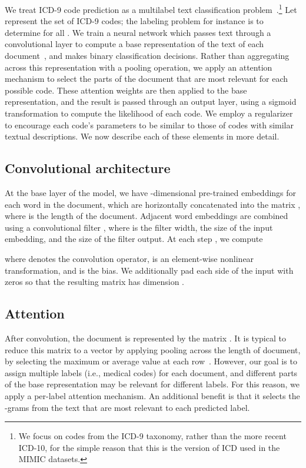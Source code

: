 \documentclass[11pt,a4paper]{article}
\begin{document}
We treat ICD-9 code prediction as a multilabel text classification problem~\cite{mccallum1999multi}.\footnote{We focus on codes from the ICD-9 taxonomy, rather than the more recent ICD-10, for the simple reason that this is the version of ICD used in the MIMIC datasets.} Let  represent the set of ICD-9 codes; the labeling problem for instance  is to determine  for all . We train a neural network which passes text through a convolutional layer to compute a base representation of the text of each document~\cite{kim2014convolutional}, and makes  binary classification decisions. Rather than aggregating across this representation with a pooling operation, we apply an attention mechanism to select the parts of the document that are most relevant for each possible code. These attention weights are then applied to the base representation, and the result is passed through an output layer, using a sigmoid transformation to compute the likelihood of each code. 
We employ a regularizer to encourage each code's parameters to be similar to those of codes with similar textual descriptions. We now describe each of these elements in more detail.

\subsection{Convolutional architecture}
At the base layer of the model, we have {-dimensional} pre-trained embeddings for each word in the document, which are horizontally concatenated into the matrix , where  is the length of the document. 
Adjacent word embeddings are combined using a convolutional filter , where  is the filter width,  the size of the input embedding, and  the size of the filter output. At each step , we compute

where  denotes the convolution operator,  is an element-wise nonlinear transformation, and  is the bias. 
We additionally pad each side of the input with zeros so that the resulting matrix  has dimension .

\subsection{Attention}\label{sec:attn}
After convolution, the document is represented by the matrix . It is typical to reduce this matrix to a vector by applying pooling across the length of document, by selecting the maximum or average value at each row~\citep{kim2014convolutional}. However, our goal is to assign multiple labels (i.e., medical codes) for each document, and different parts of the base representation may be relevant for different labels. For this reason, we apply a per-label attention mechanism. An additional benefit is that it selects the -grams from the text that are most relevant to each predicted label.
\end{document}
